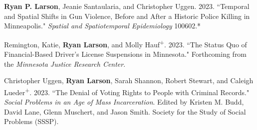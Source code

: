 \documentclass[letterpaper]{article}
\renewenvironment{itemize}{
  \begin{list}{}{
    \setlength{\leftmargin}{1.5em}
  }
}{
  \end{list}
}
\begin{document}
\begin{itemize}

\item \textbf{Ryan P. Larson}, Jeanie Santaularia, and Christopher Uggen. 2023. ``Temporal and Spatial Shifts in Gun Violence, Before and After a Historic Police Killing in Minneapolis." \textit{Spatial and Spatiotemporal Epidemiology} 100602.*

\item Remington, Katie, \textbf{Ryan Larson}, and Molly Hauf\textsuperscript{+}. 2023. ``The Status Quo of Financial-Based Driver's License Suspensions in Minnesota." Forthcoming from the \textit{Minnesota Justice Research Center}.

\item Christopher Uggen, \textbf{Ryan Larson}, Sarah Shannon, Robert Stewart, and Caleigh Lueder\textsuperscript{+}. 2023. ``The Denial of Voting Rights to People with Criminal Records." \textit{Social Problems in an Age of Mass Incarceration}. Edited by Kristen M. Budd, David Lane, Glenn Muschert, and Jason Smith. Society for the Study of Social Problems (SSSP).


\end{itemize}
\end{document}
